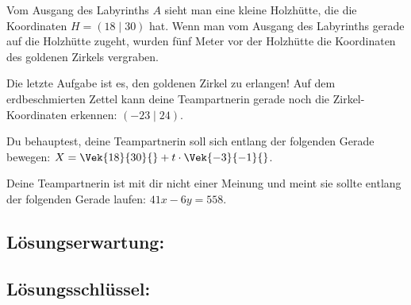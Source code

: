 \begin{langesbeispiel}
\begin{aufgabenstellung}
\item Vom Ausgang des Labyrinths $A$ sieht man eine kleine Holzhütte, die die Koordinaten $H=(18\mid 30)$ hat. Wenn man vom Ausgang des Labyrinths gerade auf die Holzhütte zugeht, wurden fünf Meter vor der Holzhütte die Koordinaten des goldenen Zirkels vergraben.%


\item Die letzte Aufgabe ist es, den goldenen Zirkel zu erlangen! Auf dem erdbeschmierten Zettel kann deine Teampartnerin gerade noch die Zirkel-Koordinaten erkennen: $(-23\mid 24)$.

Du behauptest, deine Teampartnerin soll sich entlang der folgenden Gerade bewegen: $X=\Vek{18}{30}{}+t\cdot\Vek{-3}{-1}{}$.

Deine Teampartnerin ist mit dir nicht einer Meinung und meint sie sollte entlang der folgenden Gerade laufen: $41x-6y=558$.%


\end{aufgabenstellung}

\begin{loesung}
\item \subsection{Lösungserwartung:} 


\setcounter{subitemcounter}{0}
\subsection{Lösungsschlüssel:}
 


\end{loesung}
\end{langesbeispiel}
